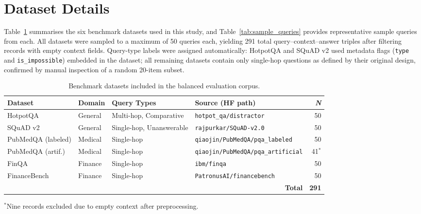 \appendix

\section{Dataset Details}
\label{app:datasets}

Table~\ref{tab:datasets} summarises the six benchmark datasets used in this study, and Table~\ref{tab:sample_queries} provides representative sample queries from each.
All datasets were sampled to a maximum of 50 queries each, yielding 291 total
query--context--answer triples after filtering records with empty context fields.
Query-type labels were assigned automatically: HotpotQA and SQuAD v2 used
metadata flags (\texttt{type} and \texttt{is\_impossible}) embedded in the
dataset; all remaining datasets contain only single-hop questions as defined by
their original design, confirmed by manual inspection of a random 20-item subset.

\begin{table}[h]
\centering
\caption{Benchmark datasets included in the balanced evaluation corpus.}
\label{tab:datasets}
\begin{tabular}{llllr}
\toprule
\textbf{Dataset} & \textbf{Domain} & \textbf{Query Types} & \textbf{Source (HF path)} & \textbf{\textit{N}} \\
\midrule
HotpotQA           & General & Multi-hop, Comparative   & \texttt{hotpot\_qa/distractor}              & 50 \\
SQuAD v2           & General & Single-hop, Unanswerable & \texttt{rajpurkar/SQuAD-v2.0}               & 50 \\
PubMedQA (labeled) & Medical & Single-hop               & \texttt{qiaojin/PubMedQA/pqa\_labeled}      & 50 \\
PubMedQA (artif.)  & Medical & Single-hop               & \texttt{qiaojin/PubMedQA/pqa\_artificial}   & 41$^{*}$ \\
FinQA              & Finance & Single-hop               & \texttt{ibm/finqa}                          & 50 \\
FinanceBench       & Finance & Single-hop               & \texttt{PatronusAI/financebench}            & 50 \\
\midrule
\multicolumn{4}{r}{\textbf{Total}} & \textbf{291} \\
\bottomrule
\end{tabular}

\smallskip
{\small $^{*}$Nine records excluded due to empty context after preprocessing.}
\end{table}

